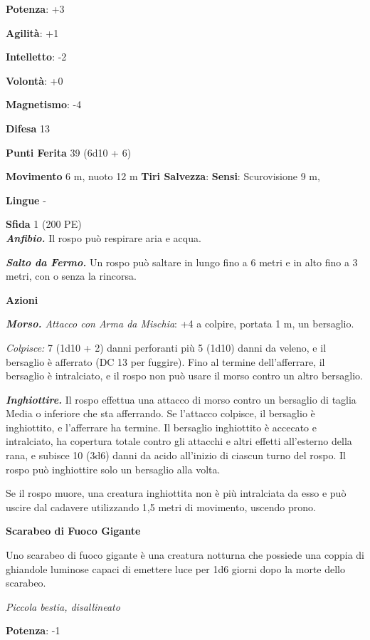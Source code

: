 \begin{multicols}{2}
\textbf{Potenza}: +3

\textbf{Agilità}: +1

\textbf{Intelletto}: -2

\textbf{Volontà}: +0

\textbf{Magnetismo}: -4

\textbf{Difesa} 13

\textbf{Punti Ferita} 39 (6d10 + 6)

\textbf{Movimento} 6 m, nuoto 12 m
\textbf{Tiri Salvezza}:
\textbf{Sensi}: Scurovisione 9 m, 

\textbf{Lingue} -

\textbf{Sfida} 1 (200 PE)\smallskip\\

\emph{\textbf{Anfibio.}} Il rospo può respirare aria e acqua.

\emph{\textbf{Salto da Fermo.}} Un rospo può saltare in lungo fino a 6
metri e in alto fino a 3 metri, con o senza la rincorsa.

\smallskip\textbf{Azioni}

\emph{\textbf{Morso.} Attacco con Arma da Mischia}: +4 a colpire,
portata 1 m, un bersaglio.

\emph{Colpisce:} 7 (1d10 + 2) danni perforanti più 5 (1d10) danni da
veleno, e il bersaglio è afferrato (DC 13 per fuggire). Fino al termine
dell'afferrare, il bersaglio è intralciato, e il rospo non può usare il
morso contro un altro bersaglio.

\emph{\textbf{Inghiottire.}} Il rospo effettua una attacco di morso
contro un bersaglio di taglia Media o inferiore che sta afferrando. Se
l'attacco colpisce, il bersaglio è inghiottito, e l'afferrare ha
termine. Il bersaglio inghiottito è accecato e intralciato, ha copertura
totale contro gli attacchi e altri effetti all'esterno della rana, e
subisce 10 (3d6) danni da acido all'inizio di ciascun turno del rospo.
Il rospo può inghiottire solo un bersaglio alla volta.

Se il rospo muore, una creatura inghiottita non è più intralciata da
esso e può uscire dal cadavere utilizzando 1,5 metri di movimento,
uscendo prono.

\textbf{Scarabeo di Fuoco Gigante}

Uno scarabeo di fuoco gigante è una creatura notturna che possiede una
coppia di ghiandole luminose capaci di emettere luce per 1d6 giorni dopo
la morte dello scarabeo.

\emph{Piccola bestia, disallineato}

\textbf{Potenza}: -1


\end{multicols}
